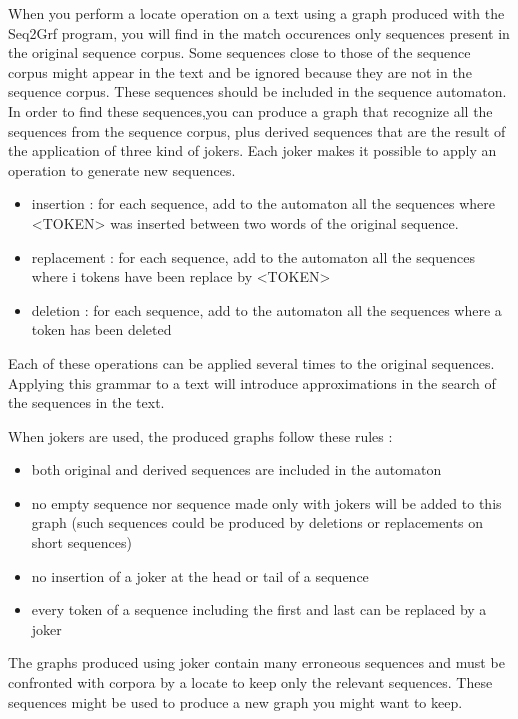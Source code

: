 When you perform a locate operation on a text using a graph produced with the Seq2Grf program, you will find in the match occurences only sequences present in the original sequence corpus.
Some sequences close to those of the sequence corpus might appear in the text and be ignored because they are not in the sequence corpus. 
These sequences should be included in the sequence automaton.
In order to find these sequences,you can produce a graph that recognize all the sequences from the sequence corpus, plus derived sequences that are the result of the application of three kind of jokers.
Each joker makes it possible to apply an operation to generate new sequences.

\begin{itemize}
	\item insertion : for each sequence, add to the automaton all the sequences where <TOKEN> was inserted between two words of the original sequence.
	\item replacement : for each sequence, add to the automaton all the sequences where i tokens have been replace by <TOKEN>
	\item deletion : for each sequence, add to the automaton all the sequences where a token has been deleted
\end{itemize}
Each of these operations can be applied several times to the original sequences.
Applying this grammar to a text will introduce approximations in the search of the sequences in the text.

When jokers are used, the produced graphs follow these rules :
\begin{itemize}
	\item both original and derived sequences are included in the automaton
	\item no empty sequence nor sequence made only with jokers will be added to this graph (such sequences could be produced by deletions or replacements on short sequences)
	\item no insertion of a joker at the head or tail of a sequence
	\item every token of a sequence including the first and last can be replaced by a joker
\end{itemize}
The graphs produced using joker contain many erroneous sequences and must be confronted with corpora by a locate to keep only the relevant sequences. These sequences might be used to produce a new graph you might want to keep.

\bigskip

